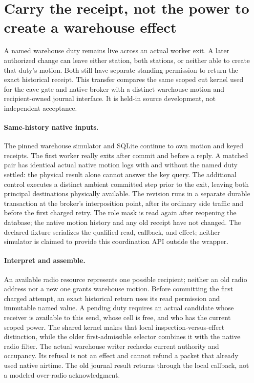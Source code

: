 \documentclass{article}
\begin{document}
\section*{Carry the receipt, not the power to create a warehouse effect}
A named warehouse duty remains live across an actual worker exit.
A later authorized change can leave either station, both stations,
or neither able to create that duty's motion. Both still have
separate standing permission to return the exact historical
receipt. This transfer compares the same scoped cut kernel used
for the cave gate and native broker with a distinct warehouse
motion and recipient-owned journal interface. It is held-in
source development, not independent acceptance.

\paragraph{Same-history native inputs.}
The pinned warehouse simulator and SQLite continue to own
motion and keyed receipts. The first worker really exits
after commit and before a reply. A matched pair has identical
actual native motion logs with and without the named duty
settled: the physical result alone cannot answer the key query.
The additional control executes a distinct ambient committed
step prior to the exit, leaving both principal destinations
physically available. The revision runs in a separate durable
transaction at the broker's interposition point, after its
ordinary side traffic and before the first charged retry.
The role mask is read again after reopening the database; the
native motion history and any old receipt have not changed.
The declared fixture serializes the qualified read, callback,
and effect; neither simulator is claimed to provide this
coordination API outside the wrapper.

\paragraph{Interpret and assemble.}
An available radio resource represents one possible recipient;
neither an old radio address nor a new one grants warehouse
motion. Before committing the first charged attempt, an exact
historical return uses its read permission and immutable named
value. A pending duty requires an actual candidate whose
receiver is available to this send, whose cell is free, and
who has the current scoped power. The shared kernel makes
that local inspection-versus-effect distinction, while the
older first-admissible selector combines it with the native
radio filter. The actual warehouse writer rechecks current
authority and occupancy. Its refusal is not an effect and cannot
refund a packet that already used native airtime. The old
journal result returns through the local callback, not a modeled
over-radio acknowledgment.
\end{document}
